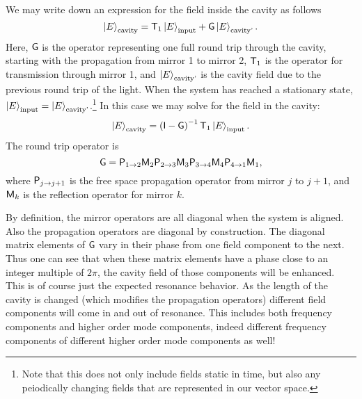 We may write down an expression for the field inside the cavity as follows
\begin{equation}
\left| E \right>_{\text{cavity}} = \mathsf{T}_1\left| E \right>_{\text{input}}+\mathsf{G}\left| E \right>_{\text{cavity'}}.
\end{equation}
Here, $\mathsf{G}$ is the operator representing one full round trip through the cavity, starting with the propagation from mirror 1 to mirror 2, $\mathsf{T}_1$ is the operator for transmission through mirror 1, and $\left| E \right>_{\text{cavity'}}$ is the cavity field due to the previous round trip of the light. %
When the system has reached a stationary state, $\left| E \right>_{\text{input}}=\left| E \right>_{\text{cavity'}}$.\footnote{Note that this does not only include fields static in time, but also any peiodically changing fields that are represented in our vector space.} In this case we may solve for the field in the cavity:
\begin{equation}
\left| E \right>_{\text{cavity}} = \left(\mathsf{I}-\mathsf{G}\right)^{-1}\mathsf{T}_1\left| E \right>_{\text{input}}.
\end{equation}
The round trip operator is 
\begin{equation}
\mathsf{G} = \mathsf{P}_{1\rightarrow 2}\mathsf{M}_2\mathsf{P}_{2\rightarrow 3}\mathsf{M}_3\mathsf{P}_{3\rightarrow 4}\mathsf{M}_4\mathsf{P}_{4\rightarrow 1}\mathsf{M}_1,
\end{equation}
where $\mathsf{P}_{j\rightarrow j+1}$ is the free space propagation operator from mirror $j$ to $j+1$, and $\mathsf{M}_k$ is the reflection operator for mirror $k$.

By definition, the mirror operators are all diagonal when the system is aligned. %
Also the propagation operators are diagonal by construction. %
The diagonal matrix elements of $\mathsf{G}$ vary in their phase from one field component to the next. %
Thus one can see that when these matrix elements have a phase close to an integer multiple of $2\pi$, the cavity field of those components will be enhanced. %
This is of course just the expected resonance behavior. %
As the length of the cavity is changed (which modifies the propagation operators) different field components will come in and out of resonance. %
This includes both frequency components and higher order mode components, indeed different frequency components of different higher order mode components as well!

